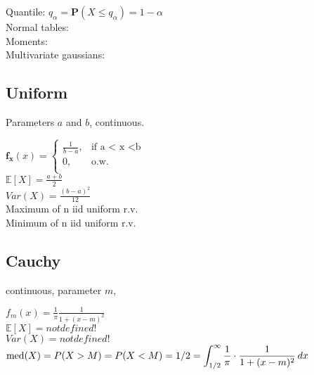 Quantile: $q_{\alpha } = \displaystyle \mathbf{P}\left(X\leq q_{\alpha }\right)=1-\alpha$\\

Normal tables:\\

Moments:\\


Multivariate gaussians:\\

\subsection*{Uniform}

Parameters $a$ and $b$, continuous.

$ \mathbf{f_x}(x)=
	\begin{cases}
		 \frac{1}{b-a},&\text{if a < x <b}\\
		0,&\text{o.w.}\\
	\end{cases}
$\\

$\mathbb{E}[X]=\frac{a+b}{2}$\\
$Var(X)=\frac{(b-a)^2}{12}$\\

Maximum of n iid uniform r.v.\\

Minimum of n iid uniform r.v.\\

\subsection{Cauchy}
continuous, parameter $m$,

$f_ m(x) = \frac{1}{\pi } \frac{1}{1 + (x - m)^2}$\\

$\mathbb{E}[X]=not defined!$\\
$Var(X)=not defined!$\\

$\text {med}(X) = P(X > M) = P(X < M)\\ = 1/2 = \displaystyle \int _{1/2}^{\infty } \frac{1}{\pi } \cdot \frac{1}{1 + (x-m)^2} \,  dx$